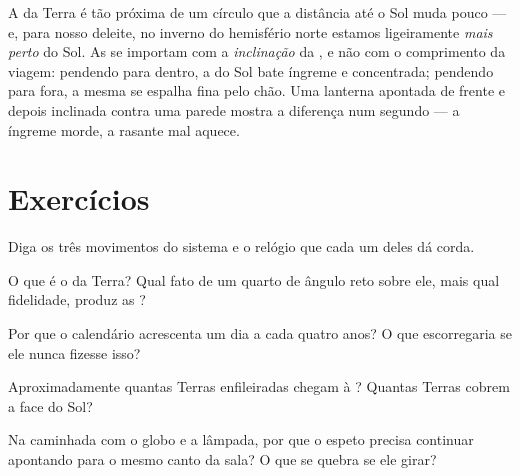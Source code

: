 \begin{remark}\label{rem:g6:sun-earth-moon:notdistance}
A  da Terra é tão próxima de um círculo que a distância até o
Sol muda pouco --- e, para nosso deleite, no inverno do hemisfério
norte estamos ligeiramente \emph{mais perto} do Sol. As  se
importam com a \emph{inclinação} da , e não com o comprimento da
viagem: pendendo para dentro, a  do Sol bate íngreme e
concentrada; pendendo para fora, a mesma  se espalha fina pelo
chão. Uma lanterna apontada de frente e depois inclinada contra uma
parede mostra a diferença num segundo --- a  íngreme morde, a 
rasante mal aquece.
\end{remark}

\section{Exercícios}

\begin{exercise}[$\star$]\label{exo:g6:sun-earth-moon:1}
Diga os três movimentos do sistema e o relógio que cada um deles dá
corda.
\end{exercise}

\begin{exercise}[$\star$]\label{exo:g6:sun-earth-moon:2}
O que é o  da Terra? Qual fato de um quarto de ângulo reto sobre
ele, mais qual fidelidade, produz as ?
\end{exercise}

\begin{exercise}[$\star$]\label{exo:g6:sun-earth-moon:3}
Por que o calendário acrescenta um dia a cada quatro anos? O que
escorregaria se ele nunca fizesse isso?
\end{exercise}

\begin{exercise}[$\star$]\label{exo:g6:sun-earth-moon:4}
Aproximadamente quantas Terras enfileiradas chegam à ? Quantas
Terras cobrem a face do Sol?
\end{exercise}

\begin{exercise}[$\star$]\label{exo:g6:sun-earth-moon:5}
Na caminhada com o globo e a lâmpada, por que o espeto precisa
continuar apontando para o mesmo canto da sala? O que se quebra se
ele girar?
\end{exercise}

